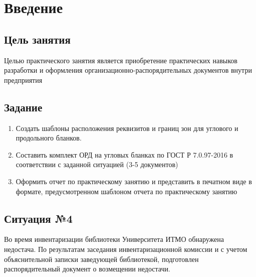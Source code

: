 \chapter{Введение}

\section{Цель занятия}

Целью практического занятия является приобретение практических навыков разработки и оформления организационно-распорядительных документов внутри предприятия

\section{Задание}
\begin{enumerate}

\item  Создать шаблоны расположения реквизитов и границ зон для углового и продольного бланков.
\item  Составить комплект ОРД на угловых бланках по ГОСТ Р 7.0.97-2016 в соответствии с заданной ситуацией (3-5 документов)
\item  Оформить отчет по практическому занятию и представить в печатном виде в формате, предусмотренном шаблоном отчета по практическому занятию
\end{enumerate}

\section{Ситуация №4}

Во время инвентаризации библиотеки Университета ИТМО обнаружена недостача. По результатам заседания инвентаризационной комиссии и с учетом объяснительной записки заведующей библиотекой, подготовлен распорядительный документ о возмещении недостачи.